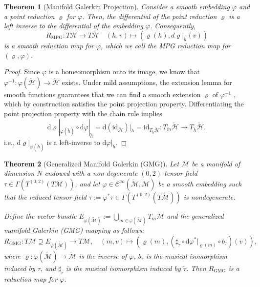 \documentclass{article}
\theoremstyle{plain}
\newtheorem{theorem}{Theorem}[section]
\theoremstyle{definition}
\theoremstyle{remark}
\begin{document}
\begin{theorem}[Manifold Galerkin Projection]
\label{them: 22}
\textit{Consider a smooth embedding $\varphi$ and a point reduction $\varrho$ for $\varphi$. Then, the differential of the point reduction $\varrho$ is a left inverse to the differential of the embedding $\varphi$. Consequently,}
\begin{equation}
R_{\text{MPG}}: T\mathcal{H} \to T\check{\mathcal{H}} \quad (h, v) \mapsto (\varrho(h), d\varrho|_h(v)) 
\end{equation}
\textit{is a smooth reduction map for $\varphi$, which we call the MPG reduction map for $(\varrho, \varphi)$.}
\end{theorem}
\begin{proof}
Since $\varphi$ is a homeomorphism onto its image, we know that $\varphi^{-1} : \varphi(\check{\mathcal{H}}) \to \check{\mathcal{H}}$ exists. Under mild assumptions, the extension lemma for smooth functions guarantees that we can find a smooth extension $\varrho$ of $\varphi^{-1}$ \cite[Lemma 2.26]{lee_smooth_manifolds} , which by construction satisfies the point projection property. Differentiating the point projection property with the chain rule implies
\begin{equation}
\mathrm{d}\varrho|_{\varphi(\check{h})} \circ \mathrm{d}\varphi|_{\check{h}} = \mathrm{d}(\mathrm{id}_{\check{\mathcal{H}}})|_{\check{h}} = \mathrm{id}_{T_{\check{h}}\check{\mathcal{H}}} : T_{\check{m}}\check{\mathcal{H}} \to T_{\check{h}}\check{\mathcal{H}}, \tag{3.10}
\end{equation}
i.e., $\mathrm{d}\varrho|_{\varphi(\check{h})}$ is a left-inverse to $\mathrm{d}\varphi|_{\check{h}}$. 
\end{proof}

\begin{theorem}[Generalized Manifold Galerkin (GMG)]
\label{thm: ss}
Let $\mathcal{M}$ be a manifold of dimension $N$ endowed with a non-degenerate $(0,2)$-tensor field $\tau \in \Gamma(T^{(0,2)}(T\mathcal{M}))$, and let $\varphi \in \mathcal{C}^{\infty}(\tilde{\mathcal{M}}, \mathcal{M})$ be a smooth embedding such that the reduced tensor field $\tilde{\tau} := \varphi^*\tau \in \Gamma(T^{(0,2)}(T\tilde{\mathcal{M}}))$ is nondegenerate. 

Define the vector bundle $E_{\varphi(\tilde{\mathcal{M}})} := \bigcup_{m \in \varphi(\tilde{\mathcal{M}})} T_m\mathcal{M}$ and the generalized manifold Galerkin (GMG) mapping as follows:
$$
R_{\text{GMG}}: T\mathcal{M} \supseteq E_{\varphi(\tilde{\mathcal{M}})} \to T\tilde{\mathcal{M}}, \quad (m,v) \mapsto \left(\varrho(m), \left(\sharp_{\check{\tau}} \circ \mathrm{d}\varphi^*|_{\varrho(m)} \circ b_{\tau}\right)(v)\right),
$$
where $\varrho: \varphi(\tilde{\mathcal{M}}) \to \tilde{\mathcal{M}}$ is the inverse of $\varphi$, $b_{\tau}$ is the musical isomorphism induced by $\tau$, and $\sharp_{\tau}$ is the musical isomorphism induced by $\tilde{\tau}$. Then $R_{\text{GMG}}$ is a reduction map for $\varphi$.
\end{theorem}
\end{document}
